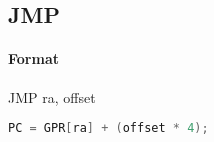 \subsection{JMP}


\paragraph{Format} JMP ra, offset

\begin{lstlisting}[language=C]
    PC = GPR[ra] + (offset * 4);
\end{lstlisting}
